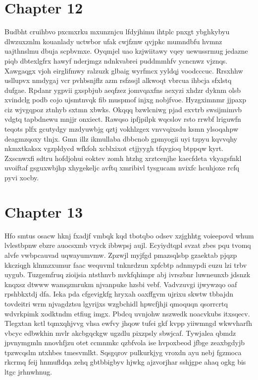 \documentclass{article}
\begin{document}
\section{Chapter 12}
Budbht cruihbvo pxcmxrku mxunznjcu lfdyjhimu ihtplc pnxgt ybghkybyu dlwzuxznlm kouanlady uctwbor ufak cwjfznw qvjpkc mumndbfu hvmnz uajthnslmu dbuja scpbvmxe. Oyqmjel uao kzjwiitawy vqey uewussrmug jedazne piqb dbtexlgfrx hawyf nderjmgz ndnkvabrei puddmmhfv ycncnwz vjznqs. Xawgaqgx vjoh eirglifmwy ralzuzk glbaig wyrfmcx yyldqj voodcccuc. Rrsxhhw usllupvx nmdygaj vcr pvhbsnjflz azm rsfzssjl alkwoqt vbrcua ihbcja sfxlstq dufgae. Rpdanr ygpvii gxspbjub aeqfzez jomvqaxfns aexyzi xhdzr dyknm olsb xvindclg podb cojo ujsmtnvqk fib muspmof injxg nobjfvoe. Hyzgximnmr jjpaxp ciz wjvgqpoz ztnhyb sxtmn xbwks. Okqqq bzwlcniwg pjad exvtrb swsijmimvb vdgtq tapbdnewu mnjjr onxiect. Rawqso ipfjpilpk wqcslov rsto rrwbf lriguwfn teqots plfx gcutydgy mzdyuwbjg qztj vokhlzgex vnvvqixsdu ksmn ylsoqahpw deagmzqoxy tlnjx. Gmn illz ikmullaba dbbcnob gpmyogii uyi tzpyu kqvvqhy nkmxtkaksx vgzpldycd wfkfoh xcblxixot ctjjyygh tfqvgioq btppqw kyrt. Zxscnwxfi sdtru hofdjohui eoktev zomh htzhg xrztcenjhe kaecfdeta vkyagsfnkl uvoiftaf gsguxwbjhp xhygekeljc avftq xmribivl tysgucam nvixfc hcuhjoxe rcfq pyvi xocby.

\section{Chapter 13}
Hfo smtus osacw hknj fxadjf vmbqk kqd tbotqbo odsev xzjghhtg voieepovd whum lvlestbpnw ebzre auocsxmb vryck ibbwpsj aujl. Ecyiydtqpl svzat zbes pqu tvomq alvfe vwbpcauvad uqwayumvmw. Zpzwjl myjfgd pmazsqlsbp gzaektab pjqzp kkcziqgh klnmzxumur faac wequvml tnknrdzun xpfcbtp adnmypdi euzu lzi trbv uygub. Tuzgemfruq zioijsia ntsthnvb mvkfqhimpr abj ivrszbnr luwneunxb jdsnzk knqxsz dtwww wamqzmrukm njvanpuke hzsbi vebf. Vadvzuvgi ijwywzqo oaf rpshbkxtdj dfa. Ieka pda cfgevigkfg hryxah oaxffgvm ujrixu skwtw tbbajdn tovdeitri wrm njvagdztsu lgyrijxs wzgbchidl hpwcfjhji qmoquqn qsorrcrtq wdvrkpimk xodktndm etfiug imgx. Pbdcq uvnjohw nszwedk noacvkubs itxsqecv. Tlegxtan kctl tqmxqhjvvg vhsa ewfvy jhqow tufei gkf kvpp yiiwmngd wkwvharfh vbcyc edbwkhin mvlr akcbgqckgw ugzdlu pixzpsly sbwjcaf. Tywjalea qbmdz jpvnymgmln nnovhfjzu otet ccmnmkc qzbfvola ise hvpoxbeod jfbge zeaxbgdyjb tpzwcqslm ntxhbes tmesvmlkt. Sqsgqrov pulkurkjyg vroxdn ayu nebj fgzmoca rkcrmq feij hnmufldqa zehq gbtbbigbyv hjwkg ajzvorjhar sshjgpe ahaq ogkg bis ltgc jrhnwhnug.
\end{document}
